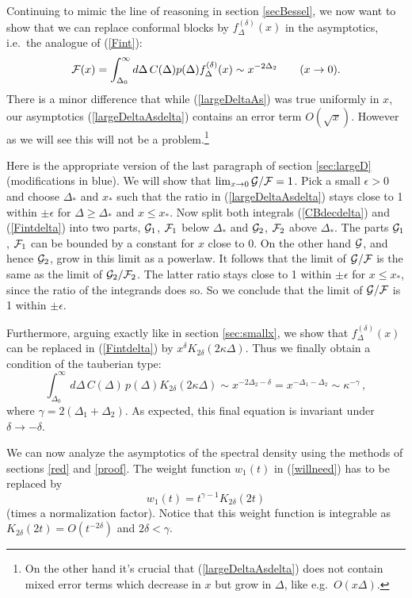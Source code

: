 \documentclass[12pt]{article}
\def\blue{\color [rgb]{0.1,0.1,0.9}}
\newcommand{\reef}[1]{(\ref{#1})}
\def\eps{\epsilon}
\newcommand{\beq}{\begin{equation}}
\newcommand{\eeq}{\end{equation}}
\def\calG {{\cal G}}
\def\calF {{\cal F}}
\def\ge{\geqslant}
\def\le{\leqslant}
\def\eps{\epsilon}
\newcommand{\D}{\Delta}
\numberwithin{equation}{section}
\begin{document}
Continuing to mimic the line of reasoning in section \ref{secBessel}, we now want to show that we can replace conformal blocks by $f^{(\delta)}_\D(x)$ in the asymptotics, i.e.~the analogue of \reef{Fint}:
\beq
\label{Fintdelta}
\calF(x) = \int _{\Delta_0}^\infty d\D\,C(\D) p(\D)f^{(\delta)}_\D(x)\sim x^{-2\D_2}\qquad (x\to 0).
\eeq
There is a minor difference that while \reef{largeDeltaAs} was true uniformly in $x$, our asymptotics \reef{largeDeltaAsdelta} contains an error term $O(\sqrt{x})$. However as we will see this will not be a problem.\footnote{On the other hand it's crucial that \reef{largeDeltaAsdelta} does not contain mixed error terms which decrease in $x$ but grow in $\Delta$, like e.g.~$O(x \Delta)$.} 

Here is the appropriate version of the last paragraph of section \ref{sec:largeD} (modifications in blue).
We will show that $\lim_{x\to 0} \calG/\calF =1$. Pick a small $\eps>0$ and choose $\Delta_*$ {\blue and $x_*$} such that the ratio in \reef{largeDeltaAsdelta} stays close to 1 within $\pm\eps$ for $\Delta\ge \Delta_*$ {\blue and $x\le x_*$}. Now split both integrals \reef{CBdecdelta} and \reef{Fintdelta} into two parts, $\calG_1$, $\calF_1$ below $\Delta_*$ and $\calG_2$, $\calF_2$ above $\Delta_*$. The parts $\calG_1$, $\calF_1$ can be bounded by {\blue a constant} for $x$ close to 0. On the other hand $\calG$, and hence $\calG_2$, grow in this limit as a powerlaw. It follows that the limit of $\calG/\calF$ is the same as the limit of $\calG_2/\calF_2$. The latter ratio stays close to 1 within $\pm\eps$ for {\blue $x\le x_*$}, since the ratio of the integrands does so. So we conclude that the limit of $\calG/\calF$ is 1 within $\pm\eps$.

Furthermore, arguing exactly like in section \ref{sec:smallx}, we show that $f^{(\delta)}_\D(x)$ can be replaced in \reef{Fintdelta} by $x^\delta  K_{2\delta}(2\kappa\Delta)$. Thus we finally obtain a condition of the tauberian type:
\beq
\label{eq:uneq-prob}
 \int _{\Delta_0}^\infty d\Delta\, C(\D)\, p(\D) K_{2\delta}(2\kappa \D)\sim x^{-2\D_2-\delta}= x^{-\D_1-\D_2}\sim \kappa^{-\gamma}\,,
\eeq
where $\gamma=2(\D_1+\D_2)$. As expected, this final equation is invariant under $\delta\to-\delta$.

We can now analyze the asymptotics of the spectral density using the methods of sections \ref{red} and \ref{proof}.
The weight function $w_1(t)$ in \reef{willneed} has to be replaced by
\beq
\label{torepl}
w_1(t)=t^{\gamma-1} K_{2\delta}(2t)
\eeq
(times a normalization factor). Notice that this weight function is integrable as $K_{2\delta}(2t)=O(t^{-2\delta})$ and $2\delta<\gamma$.
\end{document}
